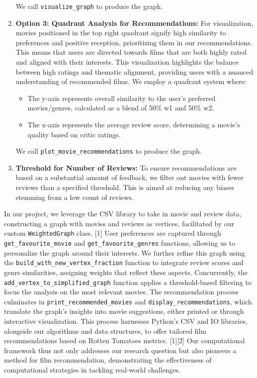 \documentclass[fontsize=11pt]{article}
\begin{document}
\begin{enumerate}
    We call \texttt{visualize\_graph} to produce the graph.
    
    \item \textbf{Option 3: Quadrant Analysis for Recommendations:} For visualization, movies positioned in the top right quadrant signify high similarity to preferences and positive reception, prioritizing them in our recommendations. This means that users are directed towards films that are both highly rated and aligned with their interests. This visualization highlights the balance between high ratings and thematic alignment, providing users with a nuanced understanding of recommended films. We employ a quadrant system where:
    \begin{itemize}
        \item The y-axis represents overall similarity to the user's preferred movies/genres, calculated as a blend of 50\% w1 and 50\% w2.
        \item The x-axis represents the average review score, determining a movie's quality based on critic ratings.
    \end{itemize}
\vspace{0.5cm}

    We call \texttt{plot\_movie\_recommendations} to produce the graph.
    
    \item \textbf{Threshold for Number of Reviews:} To ensure recommendations are based on a substantial amount of feedback, we filter out movies with fewer reviews than a specified threshold. This is aimed at reducing any biases stemming from a low count of reviews.
\end{enumerate}

\noindent In our project, we leverage the CSV library to take in movie and review data, constructing a graph with movies and reviews as vertices, facilitated by our custom \texttt{WeightedGraph} class. [1] User preferences are captured through \texttt{get\_favourite\_movie} and \texttt{get\_favourite\_genres} functions, allowing us to personalize the graph around their interests. We further refine this graph using the \texttt{build\_with\_new\_vertex\_fraction} function to integrate review scores and genre similarities, assigning weights that reflect these aspects. Concurrently, the \texttt{add\_vertex\_to\_simplified\_graph} function applies a threshold-based filtering to focus the analysis on the most relevant movies. The recommendation process culminates in \texttt{print\_recommended\_movies} and \texttt{display\_recommendations}, which translate the graph's insights into movie suggestions, either printed or through interactive visualization. This process harnesses Python's CSV and IO libraries, alongside our algorithms and data structures, to offer tailored film recommendations based on Rotten Tomatoes metrics. [1][2] Our computational framework thus not only addresses our research question but also pioneers a method for film recommendation, demonstrating the effectiveness of computational strategies in tackling real-world challenges.
\vspace{0.5cm}
\end{document}
